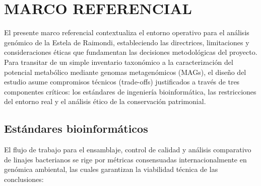 
\chapter{ MARCO REFERENCIAL}
\label{chap:marco_referencial}

El presente marco referencial contextualiza el entorno operativo para el análisis genómico de la Estela de Raimondi, estableciendo las directrices, limitaciones y consideraciones éticas que fundamentan las decisiones metodológicas del proyecto. Para transitar de un simple inventario taxonómico a la caracterización del potencial metabólico mediante genomas metagenómicos (MAGs), el diseño del estudio asume compromisos técnicos (trade-offs) justificados a través de tres componentes críticos: los estándares de ingeniería bioinformática, las restricciones del entorno real y el análisis ético de la conservación patrimonial.

\section{Estándares bioinformáticos}
\label{subsec:estandares_bioinformaticos}

El flujo de trabajo para el ensamblaje, control de calidad y análisis comparativo de linajes bacterianos se rige por métricas consensuadas internacionalmente en genómica ambiental, las cuales garantizan la viabilidad técnica de las conclusiones:

